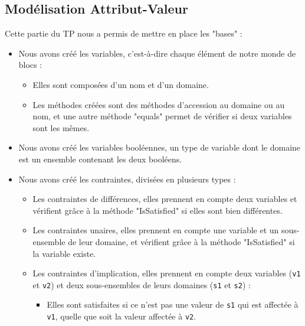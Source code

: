 \documentclass[12pt]{article}
\begin{document}
        \subsection{Modélisation Attribut-Valeur}
            Cette partie du TP nous a permis de mettre en place les "bases" :
            \begin{itemize}
                \item Nous avons créé les variables, c'est-à-dire chaque élément de notre monde de blocs :
                    \begin{itemize}
                        \item Elles sont composées d'un nom et d'un domaine.
                        \item Les méthodes créées sont des méthodes d’accession au domaine ou au nom, et une autre méthode "equals" permet de vérifier si deux variables sont les mêmes.
                    \end{itemize}
                \item Nous avons créé les variables booléennes, un type de variable dont le domaine est un ensemble contenant les deux booléens.
                \item Nous avons créé les contraintes, divisées en plusieurs types :
                    \begin{itemize}
                        \item Les contraintes de différences, elles prennent en compte deux variables et vérifient grâce à la méthode "IsSatisfied" si elles sont bien différentes.
                        \item Les contraintes unaires, elles prennent en compte une variable et un sous-ensemble de leur domaine, et vérifient grâce à la méthode "IsSatisfied" si la variable existe.
                        \item Les contraintes d'implication, elles prennent en compte deux variables (\texttt{v1} et \texttt{v2}) et deux sous-ensembles de leurs domaines (\texttt{s1} et \texttt{s2}) :
                            \begin{itemize}
                                \item Elles sont satisfaites si ce n’est pas une valeur de \texttt{s1} qui est affectée à \texttt{v1}, quelle que soit la valeur affectée à \texttt{v2}.
                            \end{itemize}
                    \end{itemize}
            \end{itemize}
\end{document}
